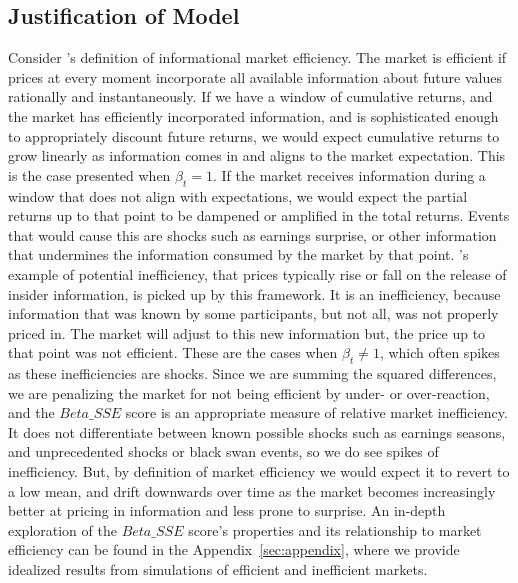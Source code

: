 \subsection{Justification of Model}
Consider \citet{fama_EMH}'s definition of informational market efficiency. The market is efficient if prices at every moment incorporate all available information about future values rationally and instantaneously.
If we have a window of cumulative returns, and the market has efficiently incorporated information, and is sophisticated enough to appropriately discount future returns, we would expect cumulative returns to 
grow linearly as information comes in and aligns to the market expectation. This is the case presented when $\beta_t = 1$. 
If the market receives information during a window that does not align with expectations, we would expect the partial returns up to that point to be dampened or amplified in the total returns.
Events that would cause this are shocks such as earnings surprise, or other information that undermines the information
consumed by the market by that point. \citet{fama_EMH}'s example of potential inefficiency, that prices typically rise or fall on the release of insider information, is picked up by this framework.
It is an inefficiency, because information that was known by some participants, but not all, was not properly priced in. The market will adjust to this new information but, the price up to that point was not efficient. These are the cases when $\beta_t \neq 1$, which often spikes as these inefficiencies are shocks.
Since we are summing the squared differences, we are penalizing the market for not being efficient by under- or over-reaction, and the $Beta\_SSE$ score is an 
appropriate measure of relative market inefficiency. It does not differentiate between known possible shocks such as earnings seasons, and unprecedented shocks or black swan events, so we do see spikes of inefficiency. But, by definition of market 
efficiency we would expect it to revert to a low mean, and drift downwards over time as the market becomes increasingly better at pricing in information and less prone to surprise.
An in-depth exploration of the $Beta\_SSE$ score's properties and its relationship to market efficiency can be found in the Appendix~\ref{sec:appendix}, where we 
provide idealized results from simulations of efficient and inefficient markets.